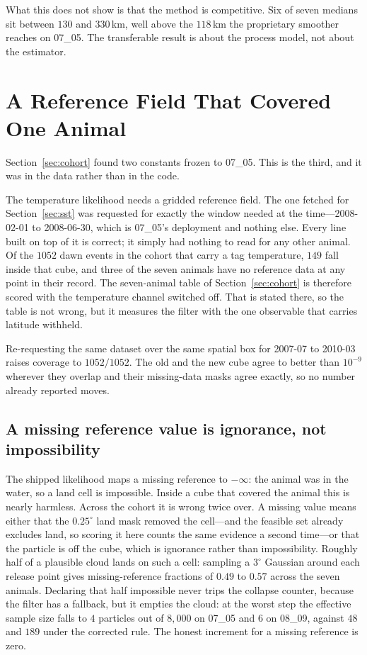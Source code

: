 \documentclass[conference]{IEEEtran}
\begin{document}
What this does not show is that the method is competitive. Six of seven medians
sit between $130$ and $330$\,\si{\km}, well above the $118$\,\si{\km} the
proprietary smoother reaches on 07\_05. The transferable result is about the
process model, not about the estimator.

\section{A Reference Field That Covered One Animal}
\label{sec:sstcohort}

Section~\ref{sec:cohort} found two constants frozen to 07\_05. This is the
third, and it was in the data rather than in the code.

The temperature likelihood needs a gridded reference field. The one fetched for
Section~\ref{sec:sst} was requested for exactly the window needed at the
time---2008-02-01 to 2008-06-30, which is 07\_05's deployment and nothing
else. Every line built on top of it is correct; it simply had nothing to read
for any other animal. Of the $1052$ dawn events in the cohort that carry a tag
temperature, $149$ fall inside that cube, and three of the seven animals have
no reference data at any point in their record. The seven-animal table of
Section~\ref{sec:cohort} is therefore scored with the temperature channel
switched off. That is stated there, so the table is not wrong, but it measures
the filter with the one observable that carries latitude withheld.

Re-requesting the same dataset over the same spatial box for 2007-07 to
2010-03 raises coverage to $1052/1052$. The old and the new cube agree to
better than $10^{-9}$ wherever they overlap and their missing-data masks agree
exactly, so no number already reported moves.

\subsection{A missing reference value is ignorance, not impossibility}

The shipped likelihood maps a missing reference to $-\infty$: the animal was in
the water, so a land cell is impossible. Inside a cube that covered the animal
this is nearly harmless. Across the cohort it is wrong twice over. A missing
value means either that the $0.25^{\circ}$ land mask removed the cell---and the
feasible set already excludes land, so scoring it here counts the same evidence
a second time---or that the particle is off the cube, which is ignorance rather
than impossibility. Roughly half of a plausible cloud lands on such a cell:
sampling a $3^{\circ}$ Gaussian around each release point gives
missing-reference fractions of $0.49$ to $0.57$ across the seven animals.
Declaring that half impossible never trips the collapse counter, because the
filter has a fallback, but it empties the cloud: at the worst step the
effective sample size falls to $4$ particles out of $8{,}000$ on 07\_05 and
$6$ on 08\_09, against $48$ and $189$ under the corrected rule. The honest
increment for a missing reference is zero.
\end{document}
